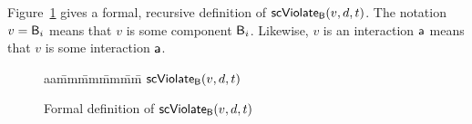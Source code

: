 \en

Figure~\ref{fig:scViolate} gives a formal, recursive definition of $\mathsf{scViolate}_{\mathsf{B}}(v,d,t)$. 
The notation $v = \mathsf{B}_i$ means that $v$ is some component $\mathsf{B}_i$. Likewise, 
$v$ is an interaction $\mathsf{a}$ means that $v$ is some interaction $\mathsf{a}$.


\ed



\begin{figure}[ht]

\setcounter{lctr}{-1}
\begin{tabbing}\label{alg:check-scViol}
aa\= mm\= mm\= mm\= mm\=\kill
$\mathsf{scViolate}_{\mathsf{B}}(v,d,t)$\\




\end{tabbing}
\vspace{-6ex}
\caption{Formal definition of $\mathsf{scViolate}_{\mathsf{B}}(v,d,t)$}
\label{fig:scViolate}
\end{figure}










